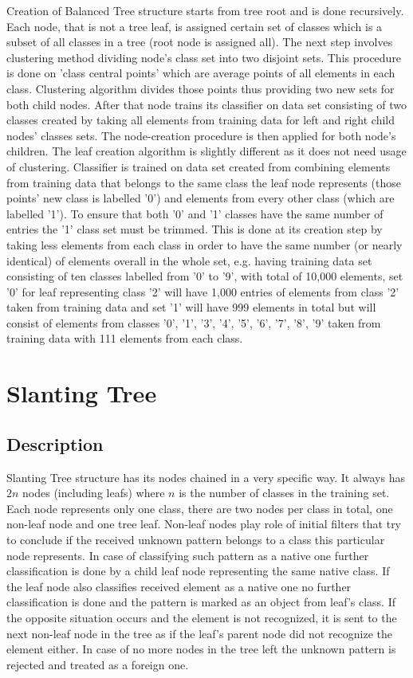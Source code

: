 Creation of Balanced Tree structure starts from tree root and is done recursively. Each node, that is not a tree leaf, is assigned certain set of classes which is a subset of all classes in a tree (root node is assigned all). The next step involves clustering method dividing node's class set into two disjoint sets. This procedure is done on 'class central points' which are average points of all elements in each class. Clustering algorithm divides those points thus providing two new sets for both child nodes. After that node trains its classifier on data set consisting of two classes created by taking all elements from training data for left and right child nodes' classes sets. The node-creation procedure is then applied for both node's children. The leaf creation algorithm is slightly different as it does not need usage of clustering. Classifier is trained on data set created from combining elements from training data that belongs to the same class the leaf node represents (those points' new class is labelled '0') and elements from every other class (which are labelled '1')\label{balanced_tree:one-vs-rest}. To ensure that both '0' and '1' classes have the same number of entries the '1' class set must be trimmed. This is done at its creation step by taking less elements from each class in order to have the same number (or nearly identical) of elements overall in the whole set, e.g. having training data set consisting of ten classes labelled from '0' to '9', with total of 10,000 elements, set '0' for leaf representing class '2' will have 1,000 entries of elements from class '2' taken from training data and set '1' will have 999 elements in total but will consist of elements from classes '0', '1', '3', '4', '5', '6', '7', '8', '9' taken from training data with 111 elements from each class.

\section{Slanting Tree}

\subsection{Description}

Slanting Tree structure has its nodes chained in a very specific way. It always has $ 2n $ nodes (including leafs) where $n$ is the number of classes in the training set. Each node represents only one class, there are two nodes per class in total, one non-leaf node and one tree leaf. Non-leaf nodes play role of initial filters that try to conclude if the received unknown pattern belongs to a class this particular node represents. In case of classifying such pattern as a native one further classification is done by a child leaf node representing the same native class. If the leaf node also classifies received element as a native one no further classification is done and the pattern is marked as an object from leaf's class. If the opposite situation occurs and the element is not recognized, it is sent to the next non-leaf node in the tree as if the leaf's parent node did not recognize the element either. In case of no more nodes in the tree left the unknown pattern is rejected and treated as a foreign one.


